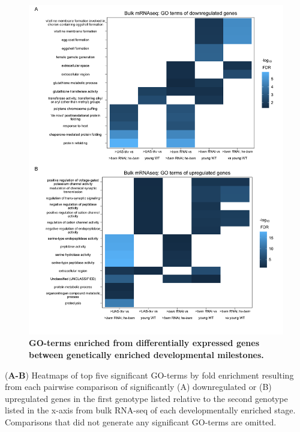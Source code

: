 \documentclass[12pt,oneside]{reedthesis}
\begin{document}
\begin{figure}

{\centering \includegraphics[width=0.9\linewidth]{./figure/Oo_site/Figure3} 

}

\caption[\textbf{GO-terms enriched from differentially expressed genes between genetically enriched developmental milestones.}]{\textbf{GO-terms enriched from differentially expressed genes between genetically enriched developmental milestones.}}\label{fig:oosite-fig-5}
\end{figure}

\setlength\parindent{0pt}(\textbf{A-B}) Heatmaps of top five significant GO-terms by fold enrichment resulting from each pairwise comparison of significantly (A) downregulated or (B) upregulated genes in the first genotype listed relative to the second genotype listed in the x-axis from bulk RNA-seq of each developmentally enriched stage. Comparisons that did not generate any significant GO-terms are omitted.

\end{document}
